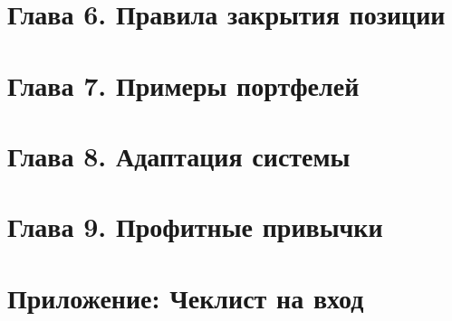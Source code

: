 \documentclass[12pt,DIV=18]{scrartcl}
\begin{document}
\section*{Глава 6. Правила закрытия позиции}
\label{chapter6}

\section*{Глава 7. Примеры портфелей}
\label{chapter7}

\section*{Глава 8. Адаптация системы}
\label{chapter8}

\section*{Глава 9. Профитные привычки}
\label{chapter9}


\appendix
\section*{Приложение: Чеклист на вход}
\label{appendix}
\end{document}
